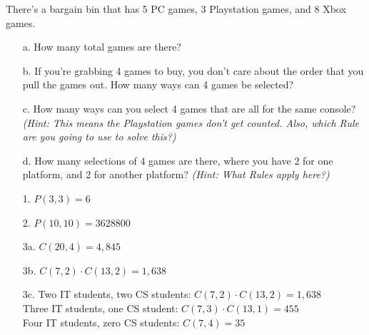 {\begin{questionNOGRADE}{\thequestion}
    \end{questionNOGRADE}

    \hrulefill

    \begin{questionNOGRADE}{\thequestion}
        There's a bargain bin that has 5 PC games, 3 Playstation games, and 8 Xbox games.

        \begin{enumerate}
            \item[a.]   How many total games are there?
            
            \item[b.]   If you're grabbing 4 games to buy, you don't care about the order
                        that you pull the games out. How many ways can 4 games be selected?

            \item[c.]   How many ways can you select 4 games that are all for the same console?
                        \textit{(Hint: This means the Playstation games don't get counted.
                        Also, which Rule are you going to use to solve this?)}

            \item[d.]   How many selections of 4 games are there, where you have 2 for one platform,
                        and 2 for another platform?
                        \textit{(Hint: What Rules apply here?)}
        \end{enumerate}
    \end{questionNOGRADE}
    
}{
    \begin{itemize}
        \item[1.]   $P(3,3) = 6$
        
        \item[2.]   $P(10, 10) = 3628800$
        
        \item[3a.]  $C(20,4) = 4,845$
        \item[3b.]  $C(7,2) \cdot C(13,2) = 1,638$
        \item[3c.]  Two IT students, two CS students: $C(7,2) \cdot C(13,2) = 1,638$ \\
                    Three IT students, one CS student: $C(7,3) \cdot C(13,1) = 455$ \\
                    Four IT students, zero CS students: $C(7, 4) = 35$


\end{itemize}}
